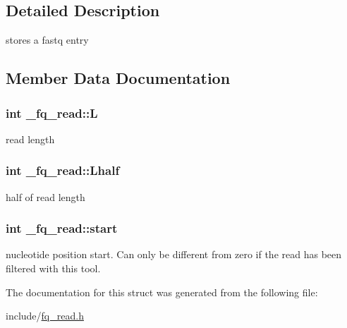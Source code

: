 \subsection{Detailed Description}
stores a fastq entry 

\subsection{Member Data Documentation}
\hypertarget{struct__fq__read_a746efa9093b5223e85ffb7274e7693ef}{
\subsubsection[{L}]{\setlength{\rightskip}{0pt plus 5cm}int \+\_\+fq\+\_\+read\+::\+L}}\label{struct__fq__read_a746efa9093b5223e85ffb7274e7693ef}
read length \hypertarget{struct__fq__read_a9cf08b81f1e78553e08fb597d30192b6}{
\subsubsection[{Lhalf}]{\setlength{\rightskip}{0pt plus 5cm}int \+\_\+fq\+\_\+read\+::\+Lhalf}}\label{struct__fq__read_a9cf08b81f1e78553e08fb597d30192b6}
half of read length \hypertarget{struct__fq__read_a0b8deb6c25c72026b4928b17e3f12ade}{
\subsubsection[{start}]{\setlength{\rightskip}{0pt plus 5cm}int \+\_\+fq\+\_\+read\+::start}}\label{struct__fq__read_a0b8deb6c25c72026b4928b17e3f12ade}
nucleotide position start. Can only be different from zero if the read has been filtered with this tool. 

The documentation for this struct was generated from the following file\+:\begin{DoxyCompactItemize}
\item 
include/\hyperlink{fq__read_8h}{fq\+\_\+read.\+h}\end{DoxyCompactItemize}
